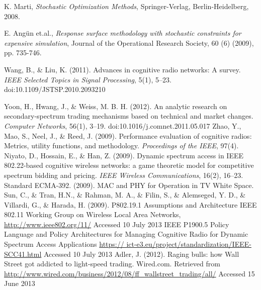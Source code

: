 \begin{thebibliography}{1}
 K. Marti, \emph{Stochastic Optimization Methods}, Springer-Verlag, Berlin-Heidelberg, 2008.

 E. Angün et.al., \emph{Response surface methodology with stochastic constraints for expensive simulation}, Journal of the Operational Research Society, 60 (6) (2009), pp. 735-746.

 Wang, B., \& Liu, K. (2011). Advances in cognitive radio networks: A survey. \textit{IEEE Selected Topics in Signal Processing}, 5(1), 5–23. doi:10.1109/JSTSP.2010.2093210

 Yoon, H., Hwang, J., \& Weiss, M. B. H. (2012). An analytic research on secondary-spectrum trading mechanisms based on technical and market changes. \textit{Computer Networks}, 56(1), 3–19. doi:10.1016/j.comnet.2011.05.017
 Zhao, Y., Mao, S., Neel, J., \& Reed, J. (2009). Performance evaluation of cognitive radios: Metrics, utility functions, and methodology. \textit{Proceedings of the IEEE}, 97(4).
 Niyato, D., Hossain, E., \& Han, Z. (2009). Dynamic spectrum access in IEEE 802.22-based cognitive wireless networks: a game theoretic model for competitive spectrum bidding and pricing. \textit{IEEE Wireless Communications}, 16(2), 16–23.
 Standard ECMA-392. (2009). MAC and PHY for Operation in TV White Space.
 Sun, C., \& Tran, H.N., \& Rahman, M. A., \& Filin, S., \& Alemseged, Y. D., \& Villardi, G., \& Harada, H. (2009). P802.19.1 Assumptions and Architecture
 IEEE 802.11 Working Group on Wireless Local Area Networks, \url{http://www.ieee802.org/11/} Accessed 10 July 2013
 IEEE P1900.5 Policy Language and Policy Architectures for Managing Cognitive Radio for Dynamic Spectrum Access Applications \url{https:// ict-e3.eu/project/standardization/IEEE-SCC41.html} Accessed 10 July 2013
 Adler, J. (2012). Raging bulls: how Wall Street got addicted to light-speed trading. Wired.com. Retrieved from \url{http://www.wired.com/business/2012/08/ff_wallstreet_trading/all/} Accessed 15 June 2013


\end{thebibliography}

